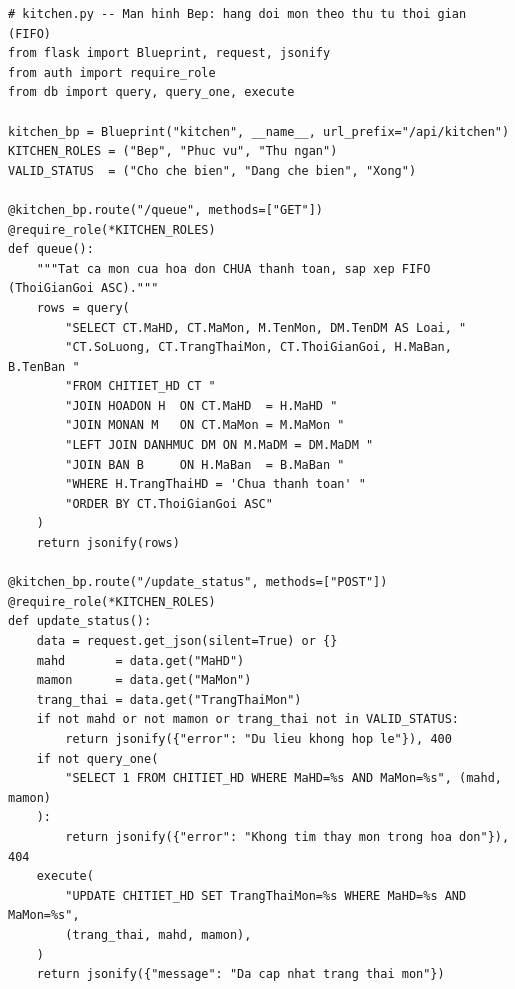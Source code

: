 \documentclass[12pt,a4paper]{report}
\begin{document}
\begin{lstlisting}[style=mypython,
  caption={File \texttt{kitchen.py} -- Hàng đợi bếp FIFO và cập nhật trạng thái món},
  label=lst:python-kitchen]
# kitchen.py -- Man hinh Bep: hang doi mon theo thu tu thoi gian (FIFO)
from flask import Blueprint, request, jsonify
from auth import require_role
from db import query, query_one, execute

kitchen_bp = Blueprint("kitchen", __name__, url_prefix="/api/kitchen")
KITCHEN_ROLES = ("Bep", "Phuc vu", "Thu ngan")
VALID_STATUS  = ("Cho che bien", "Dang che bien", "Xong")

@kitchen_bp.route("/queue", methods=["GET"])
@require_role(*KITCHEN_ROLES)
def queue():
    """Tat ca mon cua hoa don CHUA thanh toan, sap xep FIFO (ThoiGianGoi ASC)."""
    rows = query(
        "SELECT CT.MaHD, CT.MaMon, M.TenMon, DM.TenDM AS Loai, "
        "CT.SoLuong, CT.TrangThaiMon, CT.ThoiGianGoi, H.MaBan, B.TenBan "
        "FROM CHITIET_HD CT "
        "JOIN HOADON H  ON CT.MaHD  = H.MaHD "
        "JOIN MONAN M   ON CT.MaMon = M.MaMon "
        "LEFT JOIN DANHMUC DM ON M.MaDM = DM.MaDM "
        "JOIN BAN B     ON H.MaBan  = B.MaBan "
        "WHERE H.TrangThaiHD = 'Chua thanh toan' "
        "ORDER BY CT.ThoiGianGoi ASC"
    )
    return jsonify(rows)

@kitchen_bp.route("/update_status", methods=["POST"])
@require_role(*KITCHEN_ROLES)
def update_status():
    data = request.get_json(silent=True) or {}
    mahd       = data.get("MaHD")
    mamon      = data.get("MaMon")
    trang_thai = data.get("TrangThaiMon")
    if not mahd or not mamon or trang_thai not in VALID_STATUS:
        return jsonify({"error": "Du lieu khong hop le"}), 400
    if not query_one(
        "SELECT 1 FROM CHITIET_HD WHERE MaHD=%s AND MaMon=%s", (mahd, mamon)
    ):
        return jsonify({"error": "Khong tim thay mon trong hoa don"}), 404
    execute(
        "UPDATE CHITIET_HD SET TrangThaiMon=%s WHERE MaHD=%s AND MaMon=%s",
        (trang_thai, mahd, mamon),
    )
    return jsonify({"message": "Da cap nhat trang thai mon"})
\end{lstlisting}
\end{document}
